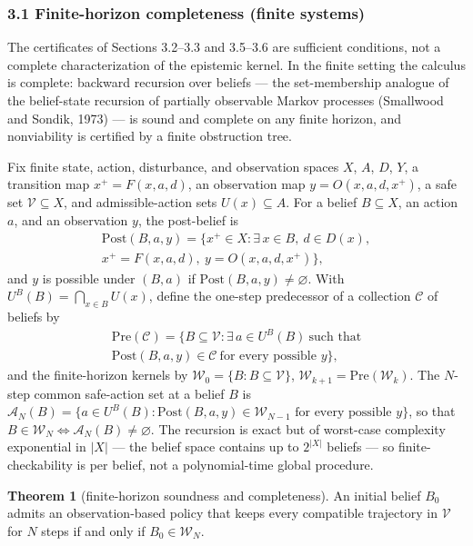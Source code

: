 \documentclass[10pt,twocolumn]{article}
\theoremstyle{definition}
\newtheorem{theorem}{Theorem}
\begin{document}
\subsubsection{3.1 Finite-horizon completeness (finite systems)}\label{finite-horizon-completeness}

The certificates of Sections 3.2--3.3 and 3.5--3.6 are sufficient conditions, not a
complete characterization of the epistemic kernel. In the finite setting
the calculus is complete: backward recursion over beliefs --- the set-membership analogue of the belief-state recursion of partially observable Markov processes (Smallwood and Sondik, 1973) --- is sound and complete on any finite horizon, and nonviability is certified by a
finite obstruction tree.

Fix finite state, action, disturbance, and observation spaces \(X\),
\(A\), \(D\), \(Y\), a transition map \(x^+ = F(x,a,d)\), an observation
map \(y = O(x,a,d,x^+)\), a safe set \(\mathcal V\subseteq X\), and
admissible-action sets \(U(x)\subseteq A\). For a belief \(B\subseteq X\),
an action \(a\), and an observation \(y\), the post-belief is
\[
\begin{gathered}
\mathrm{Post}(B,a,y) = \bigl\{ x^+\in X : \exists\, x\in B,\ d\in D(x), \\
x^+ = F(x,a,d),\ y = O(x,a,d,x^+) \bigr\},
\end{gathered}
\]
and \(y\) is possible under \((B,a)\) if \(\mathrm{Post}(B,a,y)\neq\varnothing\).
With \(U^B(B)=\bigcap_{x\in B}U(x)\), define the one-step predecessor of a
collection \(\mathcal C\) of beliefs by
\[
\begin{gathered}
\mathrm{Pre}(\mathcal C) = \bigl\{ B\subseteq\mathcal V : \exists\, a\in U^B(B)\ \text{such that}\\
\mathrm{Post}(B,a,y)\in\mathcal C\ \text{for every possible } y \bigr\},
\end{gathered}
\]
and the finite-horizon kernels by \(\mathcal W_0 = \{B : B\subseteq\mathcal V\}\),
\(\mathcal W_{k+1} = \mathrm{Pre}(\mathcal W_k)\).
The \(N\)-step common safe-action set at a belief \(B\) is
\(\mathcal{A}_N(B) = \bigl\{ a \in U^B(B) : \mathrm{Post}(B,a,y) \in \mathcal W_{N-1} \text{ for every possible } y \bigr\}\),
so that \(B \in \mathcal W_N \iff \mathcal{A}_N(B) \neq \varnothing\). The recursion is exact but of worst-case complexity exponential in
\(|X|\) --- the belief space contains up to \(2^{|X|}\) beliefs --- so
finite-checkability is per belief, not a polynomial-time global procedure.

\begin{theorem}[finite-horizon soundness and completeness]\label{thm:finite-horizon}
An initial belief \(B_0\) admits an observation-based policy that keeps
every compatible trajectory in \(\mathcal V\) for \(N\) steps if and only
if \(B_0\in\mathcal W_N\).
\end{theorem}
\end{document}
